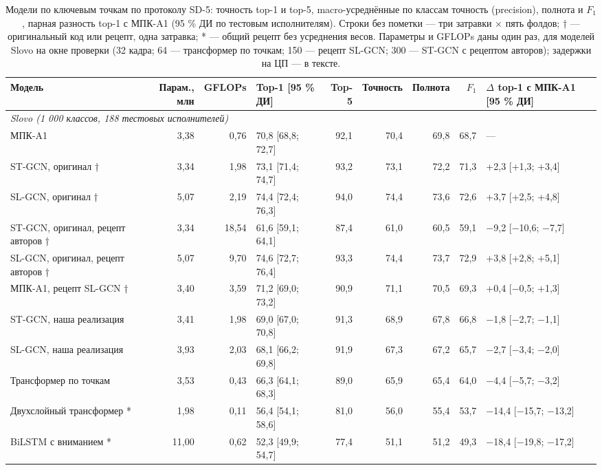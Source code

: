 \begin{table}[t]
\caption{Модели по ключевым точкам по протоколу SD-5: точность top-1 и top-5, macro-усреднённые по классам точность (precision), полнота и $F_1$, парная разность top-1 с МПК-A1 (95 \% ДИ по тестовым исполнителям). Строки без пометки — три затравки × пять фолдов; † — оригинальный код или рецепт, одна затравка; * — общий рецепт без усреднения весов. Параметры и GFLOPs даны один раз, для моделей Slovo на окне проверки (32 кадра; 64 — трансформер по точкам; 150 — рецепт SL-GCN; 300 — ST-GCN с рецептом авторов); задержки на ЦП — в тексте.}\label{tab:rsl_main}
\scriptsize\setlength{\tabcolsep}{2pt}
\centering
\begin{tabular}{lrrlrrrrl}
\toprule
\textbf{Модель} & \textbf{Парам., млн} & \textbf{GFLOPs} & \textbf{Top-1 [95 \% ДИ]} & \textbf{Top-5} & \textbf{Точность} & \textbf{Полнота} & \textbf{$F_1$} & \textbf{$\Delta$ top-1 с МПК-A1 [95 \% ДИ]} \\
\midrule
\multicolumn{9}{l}{\textit{Slovo (1 000 классов, 188 тестовых исполнителей)}} \\
МПК-A1 & 3,38 & 0,76 & 70,8 [68,8; 72,7] & 92,1 & 70,4 & 69,8 & 68,7 & --- \\
ST-GCN, оригинал † & 3,34 & 1,98 & 73,1 [71,4; 74,7] & 93,2 & 73,1 & 72,2 & 71,3 & +2,3 [+1,3; +3,4] \\
SL-GCN, оригинал † & 5,07 & 2,19 & 74,4 [72,4; 76,3] & 94,0 & 74,4 & 73,6 & 72,6 & +3,7 [+2,5; +4,8] \\
ST-GCN, оригинал, рецепт авторов † & 3,34 & 18,54 & 61,6 [59,1; 64,1] & 87,4 & 61,0 & 60,5 & 59,1 & −9,2 [−10,6; −7,7] \\
SL-GCN, оригинал, рецепт авторов † & 5,07 & 9,70 & 74,6 [72,7; 76,4] & 93,3 & 74,4 & 73,7 & 72,9 & +3,8 [+2,8; +5,1] \\
МПК-A1, рецепт SL-GCN † & 3,40 & 3,59 & 71,2 [69,0; 73,2] & 90,9 & 71,1 & 70,5 & 69,3 & +0,4 [−0,5; +1,3] \\
ST-GCN, наша реализация & 3,41 & 1,98 & 69,0 [67,0; 70,8] & 91,3 & 68,9 & 67,8 & 66,8 & −1,8 [−2,7; −1,1] \\
SL-GCN, наша реализация & 3,93 & 2,03 & 68,1 [66,2; 69,8] & 91,9 & 67,3 & 67,2 & 65,7 & −2,7 [−3,4; −2,0] \\
Трансформер по точкам & 3,53 & 0,43 & 66,3 [64,1; 68,3] & 89,0 & 65,9 & 65,4 & 64,0 & −4,4 [−5,7; −3,2] \\
Двухслойный трансформер * & 1,98 & 0,11 & 56,4 [54,1; 58,6] & 81,0 & 56,0 & 55,4 & 53,7 & −14,4 [−15,7; −13,2] \\
BiLSTM с вниманием * & 11,00 & 0,62 & 52,3 [49,9; 54,7] & 77,4 & 51,1 & 51,2 & 49,3 & −18,4 [−19,8; −17,2] \\

\end{tabular}
\end{table}
